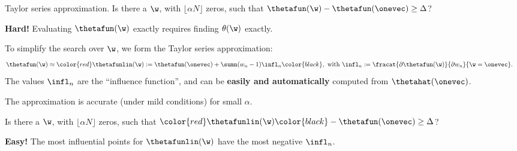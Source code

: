 \begin{frame}{Taylor series approximation.}
%
Is there a $\w$, with
$\lfloor \alpha N \rfloor$ zeros, such that
$\thetafun(\w) - \thetafun(\onevec) \ge \Delta$?

\pause
\textbf{Hard!}
Evaluating $\thetafun(\w)$ exactly requires finding $\theta(\w)$ exactly.

\pause
\hrulefill

To simplify the search over $\w$, we form the Taylor series approximation:
%
\begin{align*}
	\thetafun(\w)
		&\approx
        \color{red}
        \thetafunlin(\w)
		:= \thetafun(\onevec) +
        \sumn (w_n - 1) \infl_n
        \color{black}
        , \textrm{ with } \infl_n :=
        \fracat{\partial \thetafun(\w)}{\partial w_n}{\w = \onevec}.
\end{align*}
%
\pause
The values $\infl_n$ are the ``influence function'', and can be \textbf{easily
and automatically} computed from $\thetahat(\onevec)$.
\parencite{hampel1986robustbook}

The approximation is accurate (under mild conditions) for small $\alpha$.
\parencite{giordano2019higherorder}

\pause
\hrulefill

Is there a $\w$, with
$\lfloor \alpha N \rfloor$ zeros, such that
$\color{red} \thetafunlin(\w) \color{black} - \thetafun(\onevec) \ge \Delta$?

\pause
\textbf{Easy!}
The most influential points for $\thetafunlin(\w)$ have the most negative
$\infl_n$.

\end{frame}




